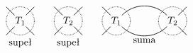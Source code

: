 \[
    \begin{tikzpicture}[baseline=-0.65ex, scale=0.1]
    \useasboundingbox (-5, -9) rectangle (5, 5);
        \draw[semithick] (-2, -2) to (-5,-5);
        \draw[semithick] (2, 2) to (5,5);
        \draw[semithick] (2, -2) to (5,-5);
        \draw[semithick] (-2, 2) to (-5,5);        %
        \draw[semithick, densely dotted] (-0, 0) circle (5);
        \node at (0, 0) {$T_1$};
        \node [below] at (0, -5) {supeł};
    \end{tikzpicture}
    \quad \quad
    \begin{tikzpicture}[baseline=-0.65ex, scale=0.1]
    \useasboundingbox (-5, -9) rectangle (5, 5);
        \draw[semithick] (-2, -2) to (-5,-5);
        \draw[semithick] (2, 2) to (5,5);
        \draw[semithick] (2, -2) to (5,-5);
        \draw[semithick] (-2, 2) to (-5,5);        %
        \draw[semithick, densely dotted] (-0, 0) circle (5);
        \node at (0, 0) {$T_2$};
        \node [below] at (0, -5) {supeł};
    \end{tikzpicture}
    \quad \quad
    \begin{tikzpicture}[baseline=-0.65ex, scale=0.1]
    \useasboundingbox (-15, -9) rectangle (15, 5);
        \draw[semithick] (-12, -2) to (-15,-5);
        \draw[semithick] (-12, 2) to (-15,5);        %
        \draw[semithick, densely dotted] (-10, 0) circle (5);
        \node at (-10, 0) {$T_1$};
        \draw[semithick] (12, -2) to (15,-5);
        \draw[semithick] (12, 2) to (15,5);        %
        \draw[semithick, densely dotted] (10, 0) circle (5);
        \node at (10, 0) {$T_2$};
        \draw[semithick] (-8, 2) [in=135, out=45] to (8, 2);
        \draw[semithick] (-8, -2) [in=-135, out=-45] to (8, -2);
        \node [below] at (0, -5) {suma};
    \end{tikzpicture}
\]